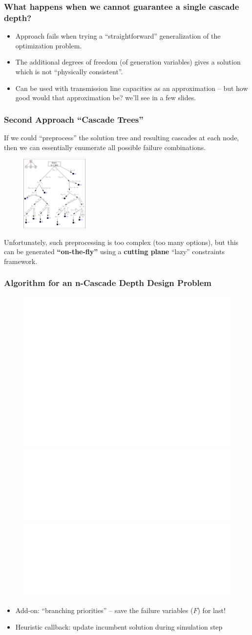 \documentclass{beamer}
\begin{document}
\begin{frame}
\frametitle{What happens when we cannot guarantee a single cascade depth?}
\begin{itemize}
	\item Approach fails when trying a ``straightforward'' generalization of the optimization problem.
	\item The additional degrees of freedom (of generation variables) gives a solution which is not ``physically consistent''.
	\item Can be used with transmission line capacities as an approximation -- but how good would that approximation be? we'll see in a few slides.
\end{itemize}
\end{frame}


\begin{frame}
\frametitle{Second Approach ``Cascade Trees''}
If we could ``preprocess'' the solution tree and resulting cascades at each node, then we can essentially enumerate all possible failure combinations.
\begin{figure}[h]
	\centering
		\includegraphics[width=0.30\textwidth]{Aux_files/figure_4_three-step-cascade-tree.png}
	\label{fig:figure_4_three-step-cascade-tree}
\end{figure}
Unfortunately, such preprocessing is too complex (too many options), but this can be generated \textbf{``on-the-fly''} using a \textbf{cutting plane} ``lazy'' constraints framework.
\end{frame}


\begin{frame}
\frametitle{Algorithm for an n-Cascade Depth Design Problem}
\small
\begin{figure}[h]
	\centering
		\includegraphics<1>[width=1\textwidth]{Aux_files/figure_5a_PGRO2_explained.pdf}
		\includegraphics<2>[width=1\textwidth]{Aux_files/figure_5b_PGRO2_explained.pdf}
		\includegraphics<3>[width=1\textwidth]{Aux_files/figure_5c_PGRO2_explained.pdf}
		\includegraphics<4->[width=1\textwidth]{Aux_files/figure_5d_PGRO2_explained.pdf}
	\label{fig:figure_5_PGRO2_algorithm}
\end{figure}
\begin{itemize}\footnotesize
	\item<5->Add-on: ``branching priorities'' -- save the failure variables ($F$) for last!
	\item<6->Heuristic callback: update incumbent solution during simulation step
\end{itemize}
\end{frame}
\end{document}
